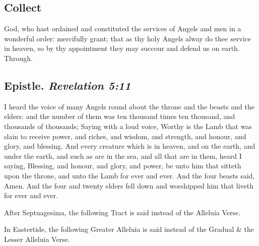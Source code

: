 \subsection{Collect}
 God, who hast ordained and constituted the services of Angels and men in a wonderful order: mercifully grant; that as thy holy Angels alway do thee service in heaven, so by thy appointment they may succour and defend us on earth. Through.


\subsection{Epistle. {\itshape Revelation 5:11}}
 I heard the voice of many Angels round about the throne and the beasts and the elders: and the number of them was ten thousand times ten thousand, and thousands of thousands; Saying with a loud voice, Worthy is the Lamb that was slain to receive power, and riches, and wisdom, and strength, and honour, and glory, and blessing. And every creature which is in heaven, and on the earth, and under the earth, and such as are in the sea, and all that are in them, heard I saying, Blessing, and honour, and glory, and power, be unto him that sitteth upon the throne, and unto the Lamb for ever and ever. And the four beasts said, Amen. And the four and twenty elders fell down and worshipped him that liveth for ever and ever.


\clearpage
\begin{rubric}
    After Septuagesima, the following Tract is said instead of the Alleluia Verse.
\end{rubric}


\begin{rubric}
    In Eastertide, the following Greater Alleluia is said instead of the Gradual \& the Lesser Alleluia Verse.
\end{rubric}

